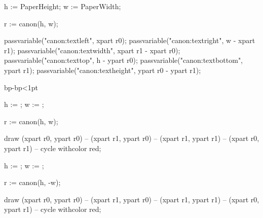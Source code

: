 
\startMPcalculation
	h := PaperHeight;
	w := PaperWidth;

	r := canon(h, w); %

	passvariable("canon:textleft",   xpart r0);
	passvariable("canon:textright",  w - xpart r1);
	passvariable("canon:textwidth",  xpart r1 - xpart r0);
	passvariable("canon:texttop",    h - ypart r0);
	passvariable("canon:textbottom", ypart r1);
	passvariable("canon:textheight", ypart r0 - ypart r1);
\stopMPcalculation

%
	\ifabsdim\dimexpr{}bp-bp\relax<1pt
		\enablemode[singlesided]
	\else
		\enablemode[doublesided]
	\fi
\stopnotallmodes

\startmode[debug]

			h := \overlayheight;
			w := \overlaywidth;

			r := canon(h, w);

			draw (xpart r0, ypart r0)
			  -- (xpart r1, ypart r0)
			  -- (xpart r1, ypart r1)
			  -- (xpart r0, ypart r1) -- cycle withcolor red;

		\stopreusableMPgraphic

	\stopmode

	\startmode[doublesided]
			h := \overlayheight;
			w := \overlaywidth;

			r := canon(h, -w);

			draw (xpart r0, ypart r0)
			  -- (xpart r1, ypart r0)
			  -- (xpart r1, ypart r1)
			  -- (xpart r0, ypart r1) -- cycle withcolor red;

		\stopreusableMPgraphic

	\stopmode

	\startmode[singlesided]
		\setupbackgrounds[page]     [background=canon-recto]
	\stopmode
	\startmode[doublesided]
		\setupbackgrounds[leftpage] [background=canon-verso]
		\setupbackgrounds[rightpage][background=canon-recto]
	\stopmode

